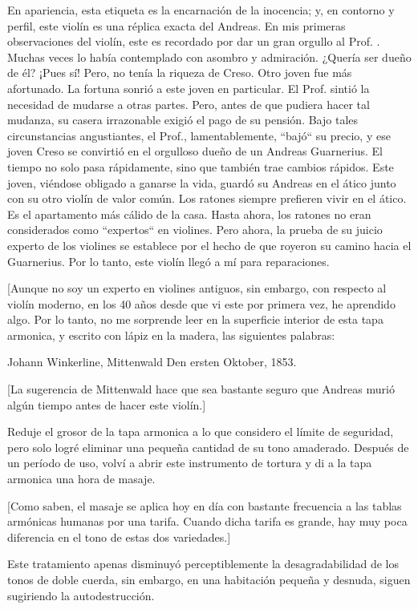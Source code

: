 \documentclass[12pt]{book}
\begin{document}
En apariencia, esta etiqueta es la encarnación de la inocencia; y, en contorno y perfil, este violín es una réplica exacta del Andreas. En mis primeras observaciones del violín, este es recordado por dar un gran orgullo al Prof. . Muchas veces lo había contemplado con asombro y admiración. ¿Quería ser dueño de él? ¡Pues sí! Pero, no tenía la riqueza de Creso. Otro joven fue más afortunado. La fortuna sonrió a este joven en particular. El Prof. sintió la necesidad de mudarse a otras partes. Pero, antes de que pudiera hacer tal mudanza, su casera irrazonable exigió el pago de su pensión. Bajo tales circunstancias angustiantes, el Prof., lamentablemente, ``bajó`` su precio, y ese joven Creso se convirtió en el orgulloso dueño de un Andreas Guarnerius. El tiempo no solo pasa rápidamente, sino que también trae cambios rápidos. Este joven, viéndose obligado a ganarse la vida, guardó su Andreas en el ático junto con su otro violín de valor común. Los ratones siempre prefieren vivir en el ático. Es el apartamento más cálido de la casa. Hasta ahora, los ratones no eran considerados como ``expertos`` en violines. Pero ahora, la prueba de su juicio experto de los violines se establece por el hecho de que royeron su camino hacia el Guarnerius. Por lo tanto, este violín llegó a mí para reparaciones.

[Aunque no soy un experto en violines antiguos, sin embargo, con respecto al violín moderno, en los 40 años desde que vi este por primera vez, he aprendido algo. Por lo tanto, no me sorprende leer en la superficie interior de esta tapa armonica, y escrito con lápiz en la madera, las siguientes palabras:

Johann Winkerline, Mittenwald Den ersten Oktober, 1853.

[La sugerencia de Mittenwald hace que sea bastante seguro que Andreas murió algún tiempo antes de hacer este violín.]

Reduje el grosor de la tapa armonica a lo que considero el límite de seguridad, pero solo logré eliminar una pequeña cantidad de su tono amaderado. Después de un período de uso, volví a abrir este instrumento de tortura y di a la tapa armonica una hora de masaje.

[Como saben, el masaje se aplica hoy en día con bastante frecuencia a las tablas armónicas humanas por una tarifa. Cuando dicha tarifa es grande, hay muy poca diferencia en el tono de estas dos variedades.]

Este tratamiento apenas disminuyó perceptiblemente la desagradabilidad de los tonos de doble cuerda, sin embargo, en una habitación pequeña y desnuda, siguen sugiriendo la autodestrucción.
\end{document}
